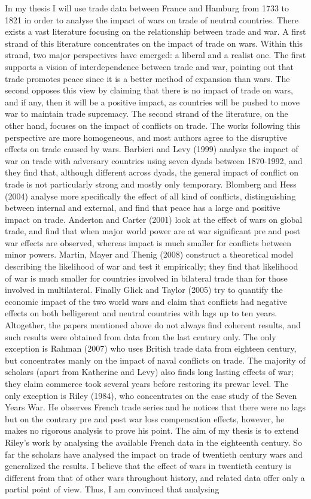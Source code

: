 \documentclass[12pt,a4paper,titlepage,english]{article}
\begin{document}
In my thesis I will use trade data between France and Hamburg from 1733 to 1821 in order to analyse the impact of wars on trade of neutral countries. There exists a vast literature focusing on the relationship between trade and war. A first strand of this literature concentrates on the impact of trade on wars. Within this strand, two major perspectives have emerged: a liberal and a realist one. The first supports a vision of interdependence between trade and war, pointing out that trade promotes peace since it is a better method of expansion than wars. The second opposes this view by claiming that there is no impact of trade on wars, and if any, then it will be a positive impact, as countries will be pushed to move war to maintain trade supremacy. The second strand of the literature, on the other hand, focuses on the impact of conflicts on trade. The works following this perspective are more homogeneous, and most authors agree to the disruptive effects on trade caused by wars. Barbieri and Levy (1999) analyse the impact of war on trade with adversary countries using seven dyads between 1870-1992, and they find that, although different across dyads, the general impact of conflict on trade is not particularly strong and mostly only temporary. Blomberg and Hess (2004) analyse more specifically the effect of all kind of conflicts, distinguishing between internal and external, and find that peace has a large and positive impact on trade. Anderton and Carter (2001) look at the effect of wars on global trade, and find that when major world power are at war significant pre and post war effects are observed, whereas impact is much smaller for conflicts between minor powers. Martin, Mayer and Thenig (2008) construct a theoretical model describing the likelihood of war and test it empirically; they find that likelihood of war is much smaller for countries involved in bilateral trade than for those involved in multilateral. Finally Glick and Taylor (2005) try to quantify the economic impact of the two world wars and claim that conflicts had negative effects on both belligerent and neutral countries with lags up to ten years. Altogether, the papers mentioned above do not always find coherent results, and such results were obtained from data from the last century only. The only exception is Rahman (2007) who uses British trade data from eighteen century, but concentrates manly on the impact of naval conflicts on trade. The majority of scholars (apart from Katherine and Levy) also finds long lasting effects of war; they claim commerce took several years before restoring its prewar level. The only exception is Riley (1984), who concentrates on the case study of the Seven Years War. He observes French trade series and he notices that there were no lags but on the contrary pre and post war loss compensation effects, however, he makes no rigorous analysis to prove his point. The aim of my thesis is to extend Riley’s work by analysing the available French data in the eighteenth century. So far the scholars have analysed the impact on trade of twentieth century wars and generalized the results. I believe that the effect of wars in twentieth century is different from that of other wars throughout history, and related data offer only a partial point of view. Thus, I am convinced that analysing 
\end{document}
